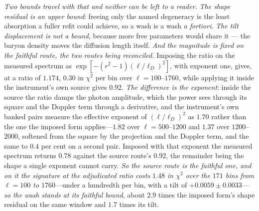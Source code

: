 \documentclass[11pt,a4paper]{article}
\theoremstyle{plain}
\theoremstyle{definition}
\theoremstyle{remark}
\begin{document}
\emph{Two bounds travel with that and neither can be left to a reader.} \emph{The shape residual is an upper
bound}: freeing only the named degeneracy is the least absorption a fuller refit could achieve, so a wash is a
wash \emph{a fortiori}. \emph{The tilt displacement is not a bound}, because more free parameters would share
it --- the baryon density moves the diffusion length itself. \emph{And the magnitude is fixed on the faithful
route, the two routes being reconciled.} Imposing the ratio on the measured spectrum as $\exp[-(r^{2}-1)(\ell/\ell_{D})^{2}]$, with exponent one,
gives, at a ratio of $1.174$, $0.30$ in $\chi^{2}$ per bin over $\ell=100$--$1760$, while applying it inside the
instrument's own source gives $0.92$. \emph{The difference is the exponent}: inside the source the ratio damps the
photon amplitude, which the power sees through its square and the Doppler term through a derivative, and the
instrument's own banked pairs measure the effective exponent of $(\ell/\ell_{D})^{2}$ as $1.70$ rather than the one
the imposed form applies---$1.82$ over $\ell=500$--$1200$ and $1.37$ over $1200$--$2000$, softened from the square by
the projection and the Doppler term, and the same to $0.4$ per cent on a second pair. Imposed with that exponent the
measured spectrum returns $0.78$ against the source route's $0.92$, the remainder being the shape a single exponent
cannot carry. \emph{So the source route is the faithful one, and on it the signature at the adjudicated ratio costs
$1.48$ in $\chi^{2}$ over the $171$ bins from $\ell=100$ to $1760$}---under a hundredth per bin, with a tilt of
$+0.0059\pm0.0033$---\emph{so the wash stands at its faithful bound}, about $2.9$ times the imposed form's shape
residual on the same window and $1.7$ times its tilt.
\end{document}
